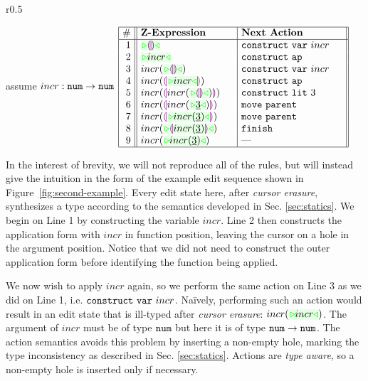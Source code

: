\begin{wrapfigure}{r}{0.5\textwidth}
\small
  \label{ex2}
\begin{center}
\colorbox{light-gray}{\hspace{44px}  assume $incr : \texttt{num} \rightarrow \texttt{num}$ \hspace{44px}}
$\arraycolsep=4px
\begin{array}{|r||l|l||l|}
\hline
\# & \textbf{Z-Expression} &
\textbf{Next Action} 
\\
\hline
1 &
\zwsel{\hhole{}} &
\aConstruct{\fvar{incr}} \hphantom{~\,\,~~}
\\ 2 &
\zwsel{incr} &
\aConstruct{\fap}
\\ 3 &
incr(\zwsel{\hhole{}}) &
\aConstruct{\fvar{incr}}
\\ 4 &
incr(\hhole{\zwsel{incr}}) &
\aConstruct{\fap}
\\ 5 &
incr(\hhole{incr(\zwsel{\hhole{}})}) \hphantom{~~~~} &
\aConstruct{\fnumlit{3}}
\\ 6 &
incr(\hhole{incr(\zwsel{\hnum{3}})}) &
\aMove{\dParent}
\\ 7 &
incr(\hhole{\zwsel{incr(\hnum{3})}}) &
\aMove{\dParent}
\\ 8 &
incr(\zwsel{\hhole{incr(\hnum{3})}})&
\aFinish
\\ 9 &
incr(\zwsel{incr(\hnum{3})}) &
\textrm{---}
\\ \hline
\end{array}
$\end{center}\vspace{-10px}
\caption{Applying the increment function.}
\label{fig:second-example}
\end{wrapfigure}
In the interest of brevity, we will not reproduce all of the rules, but will
instead give the intuition in the form of the example edit
sequence shown in Figure~\ref{fig:second-example}. Every edit state here, after \emph{cursor erasure}, synthesizes a type according
to the semantics developed in Sec. \ref{sec:statics}. 
We begin on Line 1 by constructing the variable $incr$. Line 2 then
constructs the application form with $incr$ in function position, leaving
the cursor on a hole in the argument position. Notice that we did not need
to construct the outer application form before identifying the function
being applied. 

%
We now wish to apply $incr$ again, so we perform the same action on Line 3
as we did on Line 1, i.e. $\mathtt{construct}~\mathtt{var}~incr$. Na\"ively, performing such an action would result in an 
edit state that is ill-typed after \emph{cursor erasure}:
$incr(\zwsel{incr})$. 
The argument of
$incr$ must be of type $\texttt{num}$ but here it is of type
$\texttt{num} \rightarrow \texttt{num}$. The action semantics avoids this problem by inserting a non-empty hole, marking the type inconsistency as described in Sec. \ref{sec:statics}. Actions are \emph{type aware}, so a non-empty hole is inserted only if necessary.

